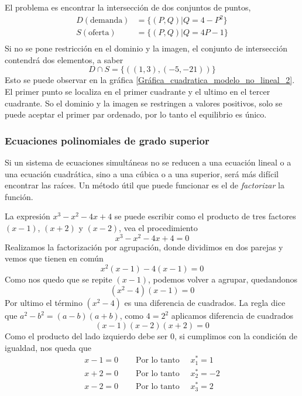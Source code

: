 El problema es encontrar la intersección de dos conjuntos de puntos, 
\begin{equation}
    \begin{aligned}
    D (\text{demanda}) &= \{(P,Q) | Q = 4 - P^2\} \\
    S (\text{oferta}) &= \{(P,Q) | Q = 4P - 1\} \\
    \end{aligned}
\end{equation} 
Si no se pone restricción en el dominio y la imagen, el conjunto de intersección contendrá dos elementos, a saber 
\[
D \cap S = \{((1,3),(-5,-21))\}
\]
Esto se puede observar en la gráfica \ref{Gráfica_cuadratica_modelo_no_lineal_2}. El primer punto se localiza en el primer cuadrante y el ultimo en el tercer cuadrante. So el dominio y la imagen se restringen a valores positivos, solo se puede aceptar el primer par ordenado, por lo tanto el equilibrio es único.


\subsubsection{Ecuaciones polinomiales de grado superior}

Si un sistema de ecuaciones simultáneas no se reducen a una ecuación lineal o a una ecuación cuadrática, sino a una cúbica o a una superior, será más difícil encontrar las raíces. Un método útil que puede funcionar es el de \textit{factorizar} la función.

\begin{ejemplo}
    \label{ejemplo_factorización}
    La expresión \(x^3-x^2-4x+4\) se puede escribir como el producto de tres factores \((x-1)\), \((x+2)\) y \((x-2)\), vea el procedimiento
    \[
    x^3-x^2-4x+4 = 0
    \]
    Realizamos la factorización por agrupación, donde dividimos en dos parejas y vemos que tienen en común 
    \[
    x^2(x-1)-4(x-1)=0
    \]
    Como nos quedo que se repite \((x-1)\), podemos volver a agrupar, quedandonos
    \[
    (x^2-4)(x-1)=0
    \]
    Por ultimo el término \((x^2-4)\) es una diferencia de cuadrados. La regla dice que \(a^2-b^2 = (a-b)(a+b)\), como \(4=2^2\) aplicamos diferencia de cuadrados
    \[
    (x-1)(x-2)(x+2)=0
    \]
    Como el producto del lado izquierdo debe ser \(0\), si cumplimos con la condición de igualdad, nos queda que 
    \begin{equation}
        \begin{aligned}
            x-1 = 0 \quad &\text{   Por lo tanto    } \quad x_1^\ast = 1 \\
            x+2 = 0 \quad &\text{   Por lo tanto    } \quad x_2^\ast = -2 \\
            x-2 = 0 \quad &\text{   Por lo tanto    } \quad x_3^\ast = 2 
        \end{aligned}
    \end{equation} 
\end{ejemplo}

